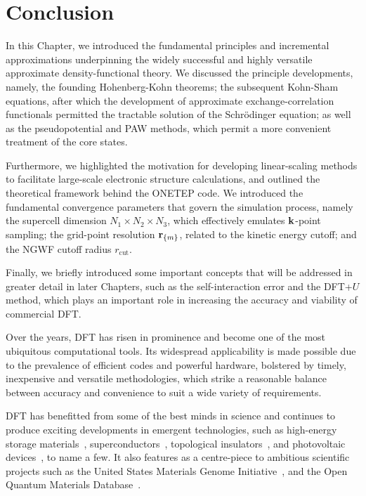 \section{Conclusion}
{
In this Chapter, 
we introduced the fundamental principles 
and incremental approximations 
underpinning the widely successful 
and highly versatile 
approximate density-functional theory.
%
We discussed the principle developments, 
namely, 
the founding Hohenberg-Kohn theorems;
the subsequent Kohn-Sham equations, 
after which the development of approximate 
exchange-correlation functionals 
permitted the tractable solution of the Schr{\"o}dinger equation; 
as well as the pseudopotential and PAW methods, 
which {permit a more convenient treatment} 
of the core states.}

{
Furthermore, 
we highlighted the motivation for 
developing linear-scaling methods 
to facilitate large-scale electronic structure calculations, 
and outlined the theoretical framework 
behind the {\sc ONETEP} code.
%
We introduced 
the fundamental convergence parameters 
that govern the simulation process, 
namely the supercell dimension   
$N_1\times N_2\times N_3$, 
which effectively emulates ${\bf k}$-point sampling; 
the grid-point resolution ${{\bf r}}_{\{m\}}$, 
related to the kinetic energy cutoff;  
and the NGWF cutoff radius $r_\textrm{cut}$.}

{
Finally, we briefly introduced 
some important concepts 
that will be addressed in greater detail 
in later Chapters, 
such as the self-interaction error 
and the DFT+$U$ method, 
which plays an important role 
in increasing the accuracy and viability 
of commercial DFT.}


%
%
{
Over the years, 
DFT has risen in prominence 
and become one of the most 
ubiquitous computational tools.
%
Its widespread applicability 
is made possible due to the 
prevalence of efficient codes and powerful hardware, 
bolstered by timely, inexpensive and versatile methodologies, 
which strike a reasonable balance between 
accuracy and convenience 
to suit a wide variety of requirements.}

{
DFT has {benefitted from} 
some of the best minds in science 
and continues to 
produce exciting developments 
in emergent technologies, 
such as 
high-energy storage materials~\cite{Saal2013,0965-0393-21-7-074005}, 
superconductors~\cite{PhysRevB.72.024545,PhysRevLett.94.037004}, 
topological insulators~\cite{PhysRevLett.105.096404,PhysRevLett.106.016402,PhysRevB.82.235121}, 
and 
photovoltaic devices~\cite{PhysRevB.79.115126,doi:10.1021/nl0732777}, 
to name a few.
%
It also features as a centre-piece 
to ambitious scientific projects 
such as the United States 
Materials Genome Initiative~\cite{holdren2011materials}, 
and the Open Quantum 
Materials Database~\cite{Kirklin2015}.}

